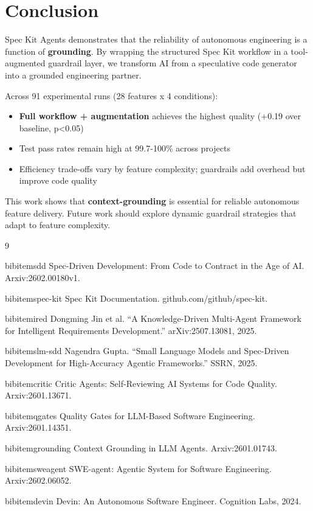 \documentclass[sigconf,anonymous,review]{acmart}
\begin{document}
\section{Conclusion}
Spec Kit Agents demonstrates that the reliability of autonomous engineering is a function of \textbf{grounding}. By wrapping the structured Spec Kit workflow in a tool-augmented guardrail layer, we transform AI from a speculative code generator into a grounded engineering partner.

Across 91 experimental runs (28 features x 4 conditions):
\begin{itemize}
  \item \textbf{Full workflow + augmentation} achieves the highest quality (+0.19 over baseline, p<0.05)
  \item Test pass rates remain high at 99.7-100\% across projects
  \item Efficiency trade-offs vary by feature complexity; guardrails add overhead but improve code quality
\end{itemize}

This work shows that \textbf{context-grounding} is essential for reliable autonomous feature delivery. Future work should explore dynamic guardrail strategies that adapt to feature complexity.

\begin{thebibliography}{9}

 bibitem{sdd}
Spec-Driven Development: From Code to Contract in the Age of AI. Arxiv:2602.00180v1.

 bibitem{spec-kit}
Spec Kit Documentation. github.com/github/spec-kit.

 bibitem{ired}
Dongming Jin et al. ``A Knowledge-Driven Multi-Agent Framework for Intelligent Requirements Development.'' arXiv:2507.13081, 2025.

 bibitem{slm-sdd}
Nagendra Gupta. ``Small Language Models and Spec-Driven Development for High-Accuracy Agentic Frameworks.'' SSRN, 2025.

 bibitem{critic}
Critic Agents: Self-Reviewing AI Systems for Code Quality. Arxiv:2601.13671.

 bibitem{qgates}
Quality Gates for LLM-Based Software Engineering. Arxiv:2601.14351.

 bibitem{grounding}
Context Grounding in LLM Agents. Arxiv:2601.01743.

 bibitem{sweagent}
SWE-agent: Agentic System for Software Engineering. Arxiv:2602.06052.

 bibitem{devin}
Devin: An Autonomous Software Engineer. Cognition Labs, 2024.

\end{thebibliography}
\end{document}
